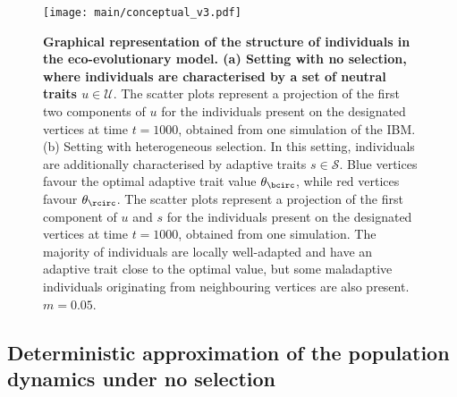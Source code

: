 \begin{figure}[t]%
  \centering
  \texttt{[image: main/conceptual\_v3.pdf]}
  \caption{\textbf{Graphical representation of the structure of individuals in the eco-evolutionary model. (a) Setting with no selection, where individuals are characterised by a set of neutral traits $u \in \mathcal{U}$}. The scatter plots represent a projection of the first two components of $u$ for the individuals present on the designated vertices at time $t=1000$, obtained from one simulation of the IBM.\\
  (b) Setting with heterogeneous selection. In this setting, individuals are additionally characterised by adaptive traits $s \in \mathcal{S}$. Blue vertices favour the optimal adaptive trait value $\theta_{\bcirc}$, while red vertices favour $\theta_{\rcirc}$. The scatter plots represent a projection of the first component of $u$ and $s$ for the individuals present on the designated vertices at time $t = 1000$, obtained from one simulation. The majority of individuals are locally well-adapted and have an adaptive trait close to the optimal value, but some maladaptive individuals originating from neighbouring vertices are also present. $m = 0.05$.}
  \label{fig:conceptual}
\end{figure}
\FloatBarrier

\subsection{Deterministic approximation of the population dynamics under no selection}\label{sec:212}

